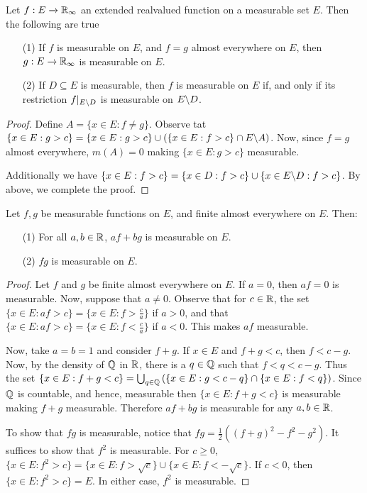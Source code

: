 \begin{theorem}\label{9.1.5}
    Let $f:E \xrightarrow{} \mathbb{R}_\infty$ an extended realvalued function on a
    measurable set $E$. Then the following are true
    \begin{enumerate}
         \item[(1)] If $f$ is measurable on  $E$, and  $f=g$ almost everywhere
             on $E$, then $g:E \xrightarrow{} \mathbb{R}_\infty$ is measurable on $E$.

         \item[(2)] If $D \subseteq E$ is measurable, then  $f$ is measurable on
              $E$ if, and only if its restriction  $f|_{E \backslash D}$ is
              measurable on $E \backslash D$.
    \end{enumerate}
\end{theorem}
\begin{proof}
    Define $A=\{x \in E : f \neq g\}$. Observe tat $\{x \in E : g>c\}=\{x \in E
    : g>c\} \cup (\{x \in E : f>c\} \cap E \backslash A)$. Now, since $f=g$ almost
    everywhere, $m(A)=0$ making $\{x \in E : g>c\}$ measurable.

    Additionally we have $\{x \in E : f>c\}=\{x \in D : f>c\} \cup \{x \in
    E \backslash D : f>c\}$. By above, we complete the proof.
\end{proof}

\begin{theorem}\label{9.1.6}
    Let $f,g$ be measurable functions on $E$, and finite almost everywhere on
    $E$. Then:
    \begin{enumerate}
        \item[(1)] For all $a,b \in \mathbb{R}$,  $af+bg$ is measurable on $E$.

        \item[(2)] $fg$ is measurable on $E$.
    \end{enumerate}
\end{theorem}
\begin{proof}
    Let $f$ and $g$ be finite almost everywhere on $E$. If  $a=0$, then  $af=0$
    is measurable. Now, suppose that  $a \neq 0$. Observe that for  $c \in \mathbb{R}$,
    the set  $\{x \in E : af>c\}=\{x \in E : f>\frac{c}{a}\}$ if $a>0$, and that
     $\{x \in E : af>c\}=\{x \in E : f<\frac{c}{a}\}$ if $a<0$. This makes  $af$
     measurable.

     Now, take  $a=b=1$ and consider $f+g$. If $x \in E$ and  $f+g<c$, then
     $f<c-g$. Now, by the density of $\mathbb{Q}$ in $\mathbb{R}$, there is a  $q \in \mathbb{Q}$ such
     that  $f<q<c-g$. Thus the set  $\{x \in E : f+g<c\}=\bigcup_{q \in \mathbb{Q}}{(\{x
     \in E : g<c-q\} \cap \{x \in E : f<q\})}$. Since $\mathbb{Q}$ is countable, and
     hence, measurable then  $\{x \in E : f+g<c\}$ is measurable making $f+g$
     measurable. Therefore  $af+bg$ is measurable for any  $a,b \in \mathbb{R}$.

     To show that $fg$ is measurable, notice that
     $fg=\frac{1}{2}((f+g)^2-f^2-g^2)$. It suffices to show that $f^2$ is
     measurable. For  $c \geq 0$, $\{x \in E : f^2>c\}=\{x \in E : f>\sqrt{c}\}
     \cup \{x \in E : f<-\sqrt{c}\}$. If $c<0$, then  $\{x \in E : f^2>c\}=E$.
     In either case, $f^2$ is measurable.
\end{proof}

